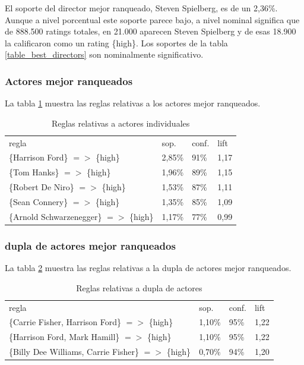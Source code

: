 \documentclass[journal]{IEEEtran}
\begin{document}
El soporte del director mejor ranqueado, Steven Spielberg, es de un 2,36\%. Aunque a nivel
porcentual este soporte parece bajo, a nivel nominal significa que de 888.500 ratings
totales, en 21.000 aparecen Steven Spielberg y de esas 18.900 la calificaron como un
rating \{high\}. Los soportes de la tabla \ref{table_best_directors} 
son nominalmente significativo. 

\subsubsection{Actores mejor ranqueados}
La tabla \ref{table_best_cast}   muestra las reglas relativas a los actores 
mejor ranqueados.
\begin{table}[ht!]
\caption{Reglas relativas a actores individuales}
\label{table_best_cast}
\centering
\begin{tabular}{l l l l }
regla & sop. & conf. & lift \\
\{Harrison Ford\} $=$$>$ \{high\} & 2,85\% & 91\% & 1,17 \\
\{Tom Hanks\} $=$$>$ \{high\} & 1,96\% & 89\% & 1,15 \\
\{Robert De Niro\} $=$$>$ \{high\} & 1,53\% & 87\% & 1,11 \\
\{Sean Connery\} $=$$>$ \{high\} & 1,35\% & 85\% & 1,09 \\
\{Arnold Schwarzenegger\} $=$$>$ \{high\} & 1,17\% & 77\% & 0,99
\end{tabular}
\end{table}


\subsubsection{dupla de actores mejor ranqueados}
La tabla \ref{table_best_tuple}   muestra las reglas relativas a la 
dupla de  actores mejor ranqueados.
\begin{table}[ht!]
\caption{Reglas relativas a dupla de actores}
\label{table_best_tuple}
\centering
\begin{tabular}{l l l l }
regla & sop. & conf. & lift \\
\{Carrie Fisher, Harrison Ford\} $=$$>$ \{high\} & 1,10\% & 95\% & 1,22 \\
\{Harrison Ford, Mark Hamill\} $=$$>$ \{high\} & 1,10\% & 95\% & 1,22 \\
\{Billy Dee Williams, Carrie Fisher\} $=$$>$ \{high\} & 0,70\% & 94\% & 1,20 \\
\end{tabular}
\end{table}
\end{document}
